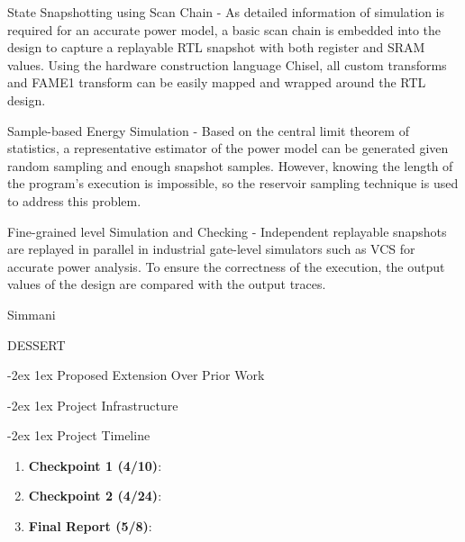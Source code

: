 \documentclass[11pt]{article}
\makeatletter
\renewcommand{\section}
{\@startsection {section}{1}{0pt}
 {-2ex}
 {1ex}
 {\bfseries\Large}}
\makeatother
\begin{document}
State Snapshotting using Scan Chain - As detailed information of simulation is required
for an accurate power model, a basic scan chain is embedded into the design to capture
a replayable RTL snapshot with both register and SRAM values. Using the hardware
construction language Chisel, all custom transforms and FAME1 transform can be easily
mapped and wrapped around the RTL design.

Sample-based Energy Simulation - Based on the central limit theorem of statistics,
a representative estimator of the power model can be generated given random sampling
and enough snapshot samples. However, knowing the length of the program's execution
is impossible, so the reservoir sampling technique is used to address this problem.

Fine-grained level Simulation and Checking - Independent replayable snapshots are replayed in parallel in
industrial gate-level simulators such as VCS for accurate power analysis. To ensure the correctness of the execution, the output values
of the design are compared with the output traces.

Simmani\autocite{simmani}

DESSERT\autocite{dessert}

\section{Proposed Extension Over Prior Work}

\section{Project Infrastructure}

\section{Project Timeline}

\begin{enumerate}
  \item \textbf{Checkpoint 1 (4/10)}:
  \item \textbf{Checkpoint 2 (4/24)}:
  \item \textbf{Final Report (5/8)}:
\end{enumerate}

\printbibliography
\end{document}

